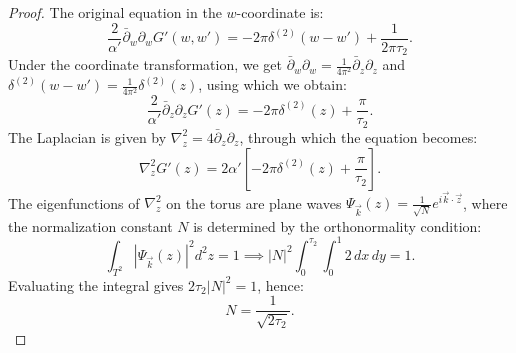 \begin{tcolorbox}[breakable]
\begin{proof}
The original equation in the $w$-coordinate is:
\begin{equation}
	\frac{2}{\alpha'} \bar{\partial}_w \partial_w G'(w,w') = -2\pi \delta^{(2)}(w-w') + \frac{1}{2\pi\tau_2}.
\end{equation}
Under the coordinate transformation, we get $\bar{\partial}_w \partial_w = \frac{1}{4\pi^2} \bar{\partial}_z \partial_z$ and $\delta^{(2)}(w-w') = \frac{1}{4\pi^2} \delta^{(2)}(z)$, using which we obtain:
\begin{equation}
	\frac{2}{\alpha'} \bar{\partial}_z \partial_z G'(z) = -2\pi \delta^{(2)}(z) + \frac{\pi}{\tau_2}.
\end{equation}
The Laplacian is given by $\nabla_z^2 = 4 \bar{\partial}_z \partial_z$, through which the equation becomes:
\begin{equation}
	\nabla_z^2 G'(z) = 2\alpha' \left[ -2\pi \delta^{(2)}(z) + \frac{\pi}{\tau_2} \right].\label{green:torus}
\end{equation}
The eigenfunctions of $\nabla_z^2$ on the torus are plane waves $\Psi_{\vec{k}}(z) = \frac{1}{\sqrt{N}} e^{i\vec{k} \cdot \vec{z}}$, where the normalization constant $N$ is determined by the orthonormality condition:
\begin{equation}
	\int_{T^2} |\Psi_{\vec{k}}(z)|^2 d^2z = 1 \implies |N|^2 \int_{0}^{\tau_2} \int_{0}^{1} 2 \, dx \, dy = 1.
\end{equation}
Evaluating the integral gives $2\tau_2 |N|^2 = 1$, hence:
\begin{equation}
	N = \frac{1}{\sqrt{2\tau_2}}.
\end{equation}


\end{proof}
\end{tcolorbox}
